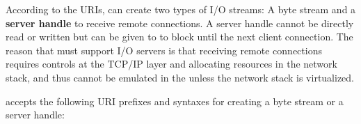 According to the URIs, 
can create two types of I/O streams:
A byte stream and
a {\bf server handle} to receive remote connections.
A server handle cannot be directly read or written
but can be given to  to block until the next client connection.
The reason that \thehostabi{} must support
I/O servers
is that receiving remote connections
requires controls
at the TCP/IP layer and allocating resources
in the network stack,
and thus cannot be emulated in the \libos{}
unless the network stack is virtualized.




 accepts the following URI prefixes and syntaxes for creating a byte stream or a server handle:



